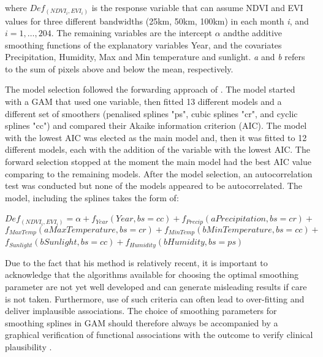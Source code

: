 where $Def_{\scriptscriptstyle (NDVI_{i}, EVI_{i})}$ is the response variable that can assume NDVI and EVI values for three different bandwidths (25km, 50km, 100km) in each month \textit{i}, and $i=1,\dots,204.$ The remaining variables are the intercept $\alpha$ andthe additive smoothing functions of the explanatory variables Year,  and the covariates Precipitation, Humidity, Max and Min temperature and sunlight. \textit{a} and \textit{b} refers to the sum of pixels above and below the mean, respectively.


The model selection followed the forwarding approach of \citealp[p.391]{zuur_saveliev_ieno_2014}. The model started with a GAM that used one variable, then fitted 13 different models and a different set of smoothers (penalised splines "ps", cubic splines "cr", and cyclic splines "cc") and compared their Akaike information criterion (AIC). The model with the lowest AIC was elected as the main model and, then it was fitted to 12 different models, each with the addition of the variable with the lowest AIC. The forward selection stopped at the moment the main model had the best AIC value comparing to the remaining models. After the model selection, an autocorrelation test was conducted but none of the models appeared to be autocorrelated. The model, including the splines takes the form of:

\begin{flushleft}
 \hspace{1em} $Def_{\scriptscriptstyle (NDVI_{i}, EVI_{i})} = \alpha + f_{\scriptscriptstyle Year}(Year, bs= cc) + f_{\scriptscriptstyle Precip}(aPrecipitation, bs= cr) +$ 
\begin{equation}
 f_{\scriptscriptstyle Max Temp}(aMax Temperature, bs= cr) + f_{\scriptscriptstyle Min Temp}(bMin Temperature, bs= cc) +  \label{eq:11.2}    
\end{equation}
 \hspace{1em} $f_{\scriptscriptstyle Sunlight}(bSunlight, bs=cc) + f_{\scriptscriptstyle Humidity}(bHumidity, bs= ps)$
\end{flushleft}


Due to the fact that his method is relatively recent, it is important to acknowledge that the algorithms available for choosing the optimal smoothing parameter are  not  yet  well  developed  and  can  generate  misleading  results if care is not taken. Furthermore,  use  of  such  criteria  can  often  lead  to  over-fitting  and  deliver  implausible  associations.  The choice  of  smoothing  parameters  for  smoothing  splines  in  GAM  should  therefore  always  be  accompanied  by  a  graphical  verification  of  functional  associations  with  the outcome  to  verify  clinical  plausibility \citep{moore_2011}.

